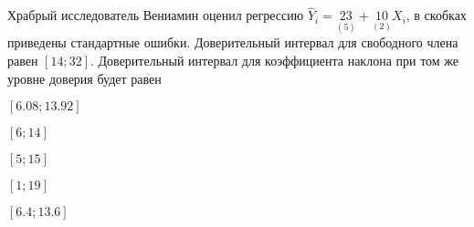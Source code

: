 
\begin{question}
Храбрый исследователь Вениамин оценил регрессию
\(\hat Y_i = \underset{(5)}{23} + \underset{(2)}{10}X_i\), в скобках
приведены стандартные ошибки. Доверительный интервал для свободного
члена равен \([14; 32]\). Доверительный интервал для коэффициента
наклона при том же уровне доверия будет равен
\begin{answerlist}
  \item \([6.08; 13.92]\)
  \item \([6; 14]\)
  \item \([5; 15]\)
  \item \([1; 19]\)
  \item \([6.4; 13.6]\)
\end{answerlist}
\end{question}


